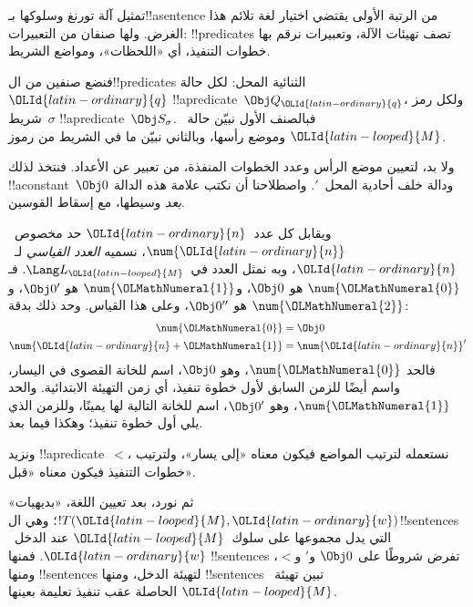\documentclass[../../../include/open-logic-section]{subfiles}
\begin{document}

\begin{explain}
تمثيل آلة تورنغ وسلوكها بـ!!a{sentence} من الرتبة الأولى يقتضي
اختيار لغة تلائم هذا الغرض. ولها صنفان من التعبيرات:
!!{predicate}s تصف تهيئات الآلة، وتعبيرات نرقم بها خطوات التنفيذ،
أي «اللحظات»، ومواضع الشريط.

فنضع صنفين من ال!!{predicate}s الثنائية المحل: لكل حالة~${\OLId{latin-ordinary}{q}}$
!!a{predicate}~$\Obj Q_{\OLId{latin-ordinary}{q}}$، ولكل رمز شريط~$\sigma$
!!a{predicate}~$\Obj S_\sigma$. فبالصنف الأول نبيّن حالة~${\OLId{latin-looped}{M}}$
وموضع رأسها، وبالثاني نبيّن ما في الشريط من رموز.

ولا بد، لتعيين موضع الرأس وعدد الخطوات المنفذة، من تعبير عن
الأعداد. فنتخذ لذلك !!a{constant}~$\Obj 0$ ودالة خلف أحادية
المحل~$\prime$. واصطلاحنا أن نكتب علامة هذه الدالة \emph{بعد}
وسيطها، مع إسقاط القوسين.

ويقابل كل عدد~${\OLId{latin-ordinary}{n}}$ حد مخصوص~$\num{{\OLId{latin-ordinary}{n}}}$، نسميه
\emph{العدد القياسي} لـ~${\OLId{latin-ordinary}{n}}$، وبه نمثل العدد في~$\Lang L_{\OLId{latin-looped}{M}}$.
فـ$\num{{\OLMathNumeral{0}}}$ هو $\Obj 0$، و$\num{{\OLMathNumeral{1}}}$ هو $\Obj 0'$،
و$\num{{\OLMathNumeral{2}}}$ هو $\Obj 0''$، وعلى هذا القياس. وحد ذلك بدقة:
\begin{align*}
\num{{\OLMathNumeral{0}}} & = \Obj 0 \\
\num{{\OLId{latin-ordinary}{n}}+{\OLMathNumeral{1}}} &= \num{{\OLId{latin-ordinary}{n}}}'
\end{align*}
فالحد $\num{{\OLMathNumeral{0}}}$، وهو $\Obj 0$، اسم للخانة القصوى في اليسار،
واسم أيضًا للزمن السابق لأول خطوة تنفيذ، أي زمن التهيئة الابتدائية.
والحد $\num{{\OLMathNumeral{1}}}$، وهو $\Obj 0'$، اسم للخانة التالية لها يمينًا،
وللزمن الذي يلي أول خطوة تنفيذ؛ وهكذا فيما بعد.

ونزيد !!a{predicate}~$<$، نستعمله لترتيب المواضع فيكون معناه
«إلى يسار»، ولترتيب خطوات التنفيذ فيكون معناه «قبل».

ثم نورد، بعد تعيين اللغة، «بديهيات» $!T({\OLId{latin-looped}{M}},{\OLId{latin-ordinary}{w}})$؛ وهي
ال!!{sentence}s التي يدل مجموعها على سلوك~${\OLId{latin-looped}{M}}$ عند الدخل~${\OLId{latin-ordinary}{w}}$.
فمنها !!{sentence}s تفرض شروطًا على $\Obj 0$ و$\prime$ و$<$،
ومنها !!{sentence}s لتهيئة الدخل، ومنها !!{sentence}s تبين
تهيئة~${\OLId{latin-looped}{M}}$ الحاصلة عقب تنفيذ تعليمة بعينها.
\end{explain}
\end{document}
